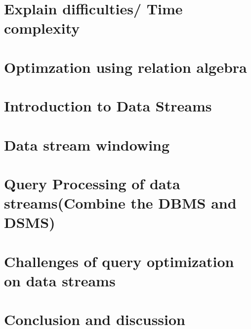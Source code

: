 \section{Explain difficulties/ Time complexity}
\section{Optimzation using relation algebra}
\section{Introduction to Data Streams}
\section{Data stream windowing}
\section{Query Processing of data streams(Combine the DBMS and DSMS)}
\section{Challenges of query optimization on data streams}
\section{Conclusion and discussion}



